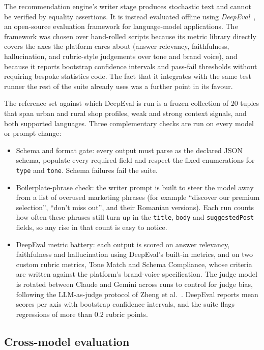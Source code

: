 The recommendation engine's writer stage produces stochastic text and cannot be verified by equality assertions. It is instead evaluated offline using \emph{DeepEval}~\cite{deepeval2024}, an open-source evaluation framework for language-model applications. The framework was chosen over hand-rolled scripts because its metric library directly covers the axes the platform cares about (answer relevancy, faithfulness, hallucination, and rubric-style judgements over tone and brand voice), and because it reports bootstrap confidence intervals and pass-fail thresholds without requiring bespoke statistics code. The fact that it integrates with the same test runner the rest of the suite already uses was a further point in its favour.

The reference set against which DeepEval is run is a frozen collection of $20$ tuples that span urban and rural shop profiles, weak and strong context signals, and both supported languages. Three complementary checks are run on every model or prompt change:

\begin{itemize}
    \item Schema and format gate: every output must parse as the declared JSON schema, populate every required field and respect the fixed enumerations for \texttt{type} and \texttt{tone}. Schema failures fail the suite.
    \item Boilerplate-phrase check: the writer prompt is built to steer the model away from a list of overused marketing phrases (for example ``discover our premium selection'', ``don't miss out'', and their Romanian versions). Each run counts how often these phrases still turn up in the \texttt{title}, \texttt{body} and \texttt{suggestedPost} fields, so any rise in that count is easy to notice.
    \item DeepEval metric battery: each output is scored on answer relevancy, faithfulness and hallucination using DeepEval's built-in metrics, and on two custom rubric metrics, Tone Match and Schema Compliance, whose criteria are written against the platform's brand-voice specification. The judge model is rotated between Claude and Gemini across runs to control for judge bias, following the LLM-as-judge protocol of Zheng et al.~\cite{zheng2023llmjudge}. DeepEval reports mean scores per axis with bootstrap confidence intervals, and the suite flags regressions of more than $0.2$ rubric points.
\end{itemize}

\subsection*{Cross-model evaluation}

